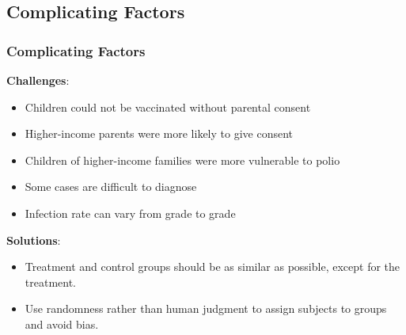 \documentclass[t,xcolor=pst,dvips]{beamer}
\begin{document}
\subsection{Complicating Factors}
\begin{frame}[t]\frametitle{Complicating Factors}
{\small
\textbf{Challenges}:
\begin{itemize}
\item \footnotesize Children could not be vaccinated without parental consent
\item \footnotesize Higher-income parents were more likely to give consent
\item Children of higher-income families were more vulnerable to polio
\item Some cases are difficult to diagnose
\item Infection rate can vary from grade to grade
\end{itemize}
\medskip

\textbf{Solutions}:
\begin{itemize}
\item \footnotesize Treatment and control groups should be as similar as possible, except for the treatment.
\item \footnotesize Use randomness rather than human judgment to assign subjects to groups and avoid bias.
\end{itemize}}
\end{frame}
 
\end{document}
